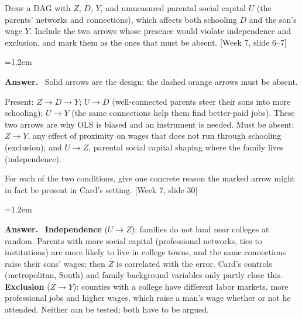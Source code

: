 \documentclass[11pt]{article}
\newenvironment{answer}{\par\smallskip
  \begin{list}{}{\leftmargin=1.2em\rightmargin=0pt}\item[]\color{dukeblue}%
  \textbf{Answer.}\ }{\end{list}\smallskip}
\newcommand{\slideref}[2]{{\footnotesize\color{gray}[Week #1, slide #2]}}
\begin{document}
\begin{enumerate}[label=(\alph*),leftmargin=*,itemsep=6pt]
\item Draw a DAG with $Z$, $D$, $Y$, and unmeasured parental social capital $U$ (the
      parents' networks and connections), which affects both schooling $D$ and the son's
      wage $Y$. Include the two arrows whose presence would violate independence and
      exclusion, and mark them as the ones that must be absent. \slideref{7}{6--7}
\begin{answer}
Solid arrows are the design; the dashed orange arrows must be absent.
\begin{center}
\end{center}
Present: $Z \to D \to Y$; $U \to D$ (well-connected parents steer their sons into more
schooling); $U \to Y$ (the same connections help them find better-paid jobs). These two
arrows are why OLS is biased and an instrument is needed. Must be absent: $Z \to Y$, any
effect of proximity on wages that does not run through schooling (exclusion); and
$U \to Z$, parental social capital shaping where the family lives (independence).
\end{answer}

\item For each of the two conditions, give one concrete reason the marked arrow might in
      fact be present in Card's setting. \slideref{7}{30}
\begin{answer}
\textbf{Independence} ($U \to Z$): families do not land near colleges at random. Parents
with more social capital (professional networks, ties to institutions) are more likely to
live in college towns, and the same connections raise their sons' wages; then $Z$ is
correlated with the error. Card's controls (metropolitan, South) and family background
variables only partly close this. \textbf{Exclusion} ($Z \to Y$): counties
with a college have different labor markets, more professional jobs and higher wages, which
raise a man's wage whether or not he attended. Neither can be tested; both have to be
argued.
\end{answer}


\end{enumerate}
\end{document}

